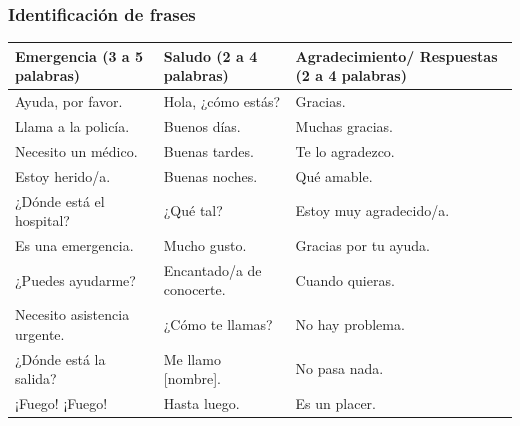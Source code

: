 \subsubsection{Identificación de frases}
\noindent
\begin{tabularx}{\textwidth}{|X|X|X|}
\hline
\textbf{Emergencia (3 a 5 palabras)} & \textbf{Saludo (2 a 4 palabras)} & \textbf{Agradecimiento/ Respuestas (2 a 4 palabras)} \\ \hline
Ayuda, por favor. & Hola, ¿cómo estás? & Gracias. \\ \hline
Llama a la policía. & Buenos días. & Muchas gracias. \\ \hline
Necesito un médico. & Buenas tardes. & Te lo agradezco. \\ \hline
Estoy herido/a. & Buenas noches. & Qué amable. \\ \hline
¿Dónde está el hospital? & ¿Qué tal? & Estoy muy agradecido/a. \\ \hline
Es una emergencia. & Mucho gusto. & Gracias por tu ayuda. \\ \hline
¿Puedes ayudarme? & Encantado/a de conocerte. & Cuando quieras. \\ \hline
Necesito asistencia urgente. & ¿Cómo te llamas? & No hay problema. \\ \hline
¿Dónde está la salida? & Me llamo [nombre]. & No pasa nada. \\ \hline
¡Fuego! ¡Fuego! & Hasta luego. & Es un placer. \\ \hline
\end{tabularx}


